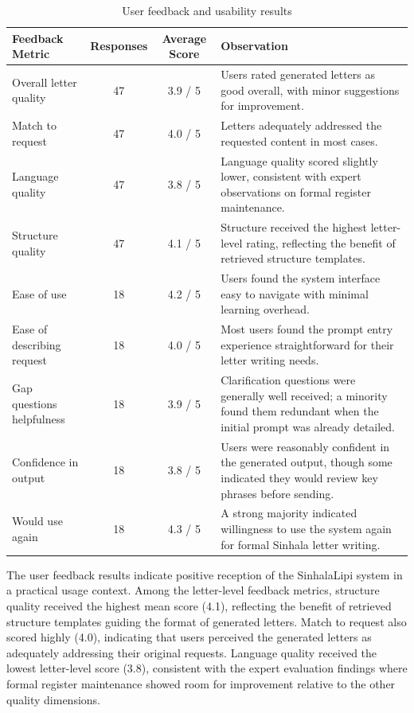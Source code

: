 \documentclass[12pt]{uomthesis}
\begin{document}
\begin{table}[!htbp]
\centering
\small
\begin{tabularx}{\linewidth}{@{}lccX@{}}
\toprule
\textbf{Feedback Metric} & \textbf{Responses} & \textbf{Average Score} & \textbf{Observation} \\
\midrule
Overall letter quality & 47 & 3.9 / 5 & Users rated generated letters as good overall, with minor suggestions for improvement. \\
Match to request & 47 & 4.0 / 5 & Letters adequately addressed the requested content in most cases. \\
Language quality & 47 & 3.8 / 5 & Language quality scored slightly lower, consistent with expert observations on formal register maintenance. \\
Structure quality & 47 & 4.1 / 5 & Structure received the highest letter-level rating, reflecting the benefit of retrieved structure templates. \\
Ease of use & 18 & 4.2 / 5 & Users found the system interface easy to navigate with minimal learning overhead. \\
Ease of describing request & 18 & 4.0 / 5 & Most users found the prompt entry experience straightforward for their letter writing needs. \\
Gap questions helpfulness & 18 & 3.9 / 5 & Clarification questions were generally well received; a minority found them redundant when the initial prompt was already detailed. \\
Confidence in output & 18 & 3.8 / 5 & Users were reasonably confident in the generated output, though some indicated they would review key phrases before sending. \\
Would use again & 18 & 4.3 / 5 & A strong majority indicated willingness to use the system again for formal Sinhala letter writing. \\
\bottomrule
\end{tabularx}
\caption{User feedback and usability results}
\label{tab:user_feedback_results}
\end{table}

The user feedback results indicate positive reception of the SinhalaLipi system in a practical usage context. Among the letter-level feedback metrics, structure quality received the highest mean score (4.1), reflecting the benefit of retrieved structure templates guiding the format of generated letters. Match to request also scored highly (4.0), indicating that users perceived the generated letters as adequately addressing their original requests. Language quality received the lowest letter-level score (3.8), consistent with the expert evaluation findings where formal register maintenance showed room for improvement relative to the other quality dimensions.
\end{document}
